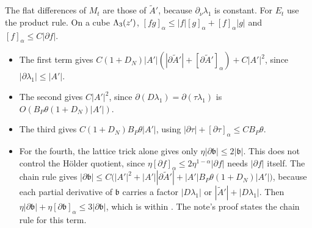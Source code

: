 \begin{detail}
\begin{step}
The flat differences of $M_t$ are those of $\tilde A'$, because $\partial_\nu\lambda_1$ is constant. For $E_t$ use the product rule. On a cube $\Lambda_3(z')$, $[fg]_\alpha\le|f|[g]_\alpha+[f]_\alpha|g|$ and $[f]_\alpha\le C|\partial f|$.
\begin{itemize}
\item The first term gives $C(1+D_N)|A'|(|\partial\tilde A'|+[\partial\tilde A']_\alpha)+C|A'|^2$, since $|\partial\lambda_1|\le|A'|$.
\item The second gives $C|A'|^2$, since $\partial(D\lambda_1)=\partial(\tau\lambda_1)$ is $O(B_P\theta(1+D_N)|A'|)$.
\item The third gives $C(1+D_N)B_P\theta|A'|$, using $|\partial\tau|+[\partial\tau]_\alpha\le CB_P\theta$.
\item For the fourth, the lattice trick alone gives only $\eta|\partial\mathfrak b|\le2|\mathfrak b|$. This does not control the H\"older quotient, since $\eta[\partial f]_\alpha\le2\eta^{1-\alpha}|\partial f|$ needs $|\partial f|$ itself. The chain rule gives $|\partial\mathfrak b|\le C\big(|A'|^2+|A'||\partial\tilde A'|+|A'|B_P\theta(1+D_N)|A'|\big)$, because each partial derivative of $\mathfrak b$ carries a factor $|D\lambda_1|$ or $|\tilde A'|+|D\lambda_1|$. Then $\eta|\partial\mathfrak b|+\eta[\partial\mathfrak b]_\alpha\le3|\partial\mathfrak b|$, which is within . The note's proof states the chain rule for this term.
\end{itemize}
\end{step}


\end{detail}
